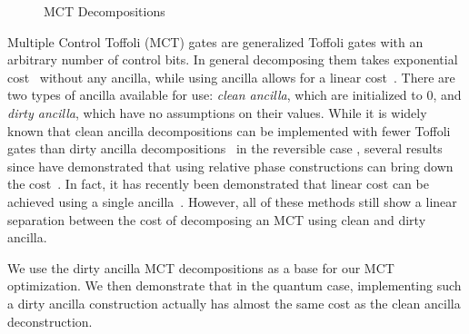 \begin{figure}[t]
  \centering
  \begin{minipage}{\linewidth}
    \centering
    \scalebox{1.0} {
      
    }
    \label{fig-clean-mct}
  \end{minipage}
  \begin{minipage}{\linewidth}
    \centering
    \scalebox{1.0} {
      
    }
    \label{fig-dirty-mct}
  \end{minipage}
  \caption{MCT Decompositions}
  \label{fig-mct-decomp}
\end{figure}


Multiple Control Toffoli (MCT) gates are generalized Toffoli gates with an arbitrary number
of control bits. In general decomposing them takes exponential cost~\cite{bib-maslov-rtof}
without any ancilla, while using ancilla allows for a linear
cost~\cite{bib-barenco-elementary}. There are two types of ancilla available for use:
\emph{clean ancilla}, which are initialized to 0, and \emph{dirty ancilla}, which have no
assumptions on their values. While it is widely known that clean ancilla decompositions
can be implemented with fewer Toffoli gates than dirty ancilla
decompositions~\cite{bib-mike-and-ike} in the reversible case , several results since have
demonstrated that using relative phase constructions can bring down the
cost~\cite{bib-maslov-rtof, bib-amy-phase-state, bib-abdessaied-mct}. In fact, it has
recently been demonstrated that linear cost can be achieved using a single
ancilla~\cite{bib-zindorf-mct}. However, all of these methods still show a linear
separation between the cost of decomposing an MCT using clean and dirty ancilla.

We use the dirty ancilla MCT decompositions as a base for our MCT optimization. We then
demonstrate that in the quantum case, implementing such a dirty ancilla construction
actually has almost the same cost as the clean ancilla deconstruction.


